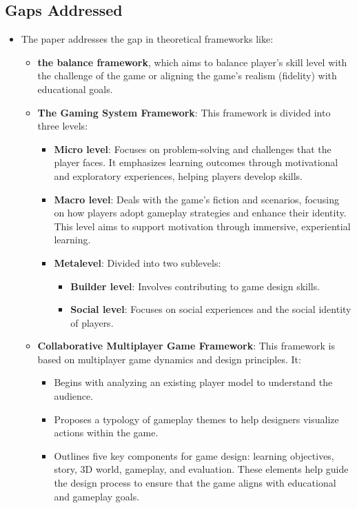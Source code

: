 \subsection{Gaps Addressed}
\begin{itemize}
    \item  The paper addresses the gap in theoretical frameworks like:
    \begin{itemize}
        \item \textbf{the balance framework}, which aims to balance player's skill level with the challenge of the game or aligning the game's realism (fidelity) with educational goals.
        \item \textbf{The Gaming System Framework}: This framework is divided into three levels:
    \begin{itemize}
        \item \textbf{Micro level}: Focuses on problem-solving and challenges that the player faces. It emphasizes learning outcomes through motivational and exploratory experiences, helping players develop skills.
        \item \textbf{Macro level}: Deals with the game's fiction and scenarios, focusing on how players adopt gameplay strategies and enhance their identity. This level aims to support motivation through immersive, experiential learning.
        \item \textbf{Metalevel}: Divided into two sublevels:
        \begin{itemize}
            \item \textbf{Builder level}: Involves contributing to game design skills.
            \item \textbf{Social level}: Focuses on social experiences and the social identity of players.
        \end{itemize}
    \end{itemize}
    \item \textbf{Collaborative Multiplayer Game Framework}: This framework is based on multiplayer game dynamics and design principles. It:
    \begin{itemize}
        \item Begins with analyzing an existing player model to understand the audience.
        \item Proposes a typology of gameplay themes to help designers visualize actions within the game.
        \item Outlines five key components for game design: learning objectives, story, 3D world, gameplay, and evaluation. These elements help guide the design process to ensure that the game aligns with educational and gameplay goals.
    \end{itemize}
    \end{itemize}
\end{itemize}

